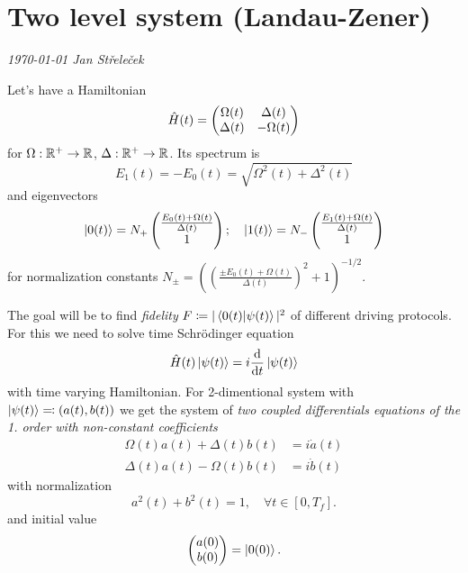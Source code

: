 \chapter{Two level system (Landau-Zener)}
\textit{\today\newline
Jan Střeleček\newline}




Let's have a Hamiltonian
\begin{equation}
    \hat{H}(t)=\begin{pmatrix}
        \Omega(t)&\Delta(t)\\
        \Delta(t)&-\Omega(t)
    \end{pmatrix}
\end{equation}
for $\Omega: \mathbb{R}^+\rightarrow \mathbb{R}$, $\Delta: \mathbb{R}^+\rightarrow \mathbb{R}$. Its spectrum is
\begin{equation}
    E_1(t)=-E_0(t)= \sqrt{\Omega^2(t)+\Delta^2(t)}
    \label{eq:energy}
\end{equation}
and eigenvectors
\begin{equation}
\ket{0(t)}=N_+ \begin{pmatrix}
 \frac{E_0(t)+\Omega(t)}{\Delta(t)} \\ 1
\end{pmatrix};\quad \ket{1(t)}=N_-\begin{pmatrix}
    \frac{E_1(t)+\Omega(t)}{\Delta(t)} \\ 1
   \end{pmatrix}
   \label{eq:eigenvectors}
\end{equation}
for normalization constants $N_\pm=\left(\left(\frac{\pm E_0(t)+\Omega(t)}{\Delta(t)}\right)^2+1\right)^{-1/2}$.

The goal will be to find \emph{fidelity} $F\coloneqq |\braket{0(t)|\psi(t)}|^2$ of different driving protocols. For this we need to solve time Schr\"odinger equation
\begin{equation}
    \hat{H}(t)\ket{\psi(t)}=i\frac{\mathrm{d}}{\mathrm{d} t}\ket{\psi(t)}
\end{equation}
with time varying Hamiltonian. For 2-dimentional system with $\ket{\psi(t)}\eqqcolon (a(t),b(t))$ we get the system of \emph{two coupled differentials equations of the 1. order with non-constant coefficients}
\begin{align}
    \Omega(t)a(t)+\Delta(t)b(t)&=i\dot a(t)\label{eq:a1}\\
    \Delta(t)a(t)-\Omega(t)b(t)&=i\dot b(t)
    \label{eq:a2}
\end{align}
with normalization
\begin{equation}
    a^2(t)+b^2(t)=1, \quad \forall t\in [0,T_f].
    \label{eq:normalizationCondition}
\end{equation}
and initial value 
\begin{equation}
    \begin{pmatrix}
        a(0)\\b(0)
    \end{pmatrix} = \ket{0(0)}.
\end{equation}

